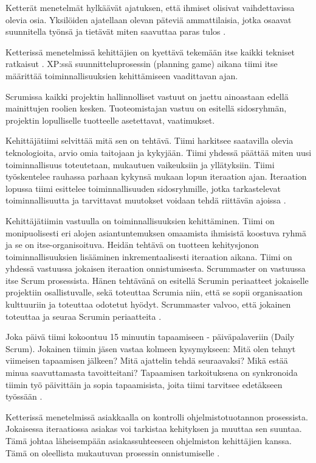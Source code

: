 \documentclass[finnish]{tktltiki2}
\theoremstyle{definition}
\theoremstyle{remark}
\begin{document}
Ketterät menetelmät hylkäävät ajatuksen, että ihmiset olisivat vaihdettavissa olevia osia. Yksilöiden ajatellaan olevan päteviä ammattilaisia, jotka osaavat suunnitella työnsä ja tietävät miten saavuttaa paras tulos \cite{FOW01a}.

Ketterissä menetelmissä kehittäjien on kyettävä tekemään itse kaikki tekniset ratkaisut \cite{FOW01a}.  XP:ssä suunnitteluprosessin (planning game) aikana tiimi itse määrittää toiminnallisuuksien kehittämiseen vaadittavan ajan.
 
Scrumissa kaikki projektin hallinnolliset vastuut on jaettu ainoastaan edellä mainittujen roolien kesken. Tuoteomistajan vastuu on esitellä sidosryhmän, projektin lopulliselle tuotteelle asetettavat, vaatimukset.

Kehittäjätiimi selvittää mitä sen on tehtävä. Tiimi harkitsee saatavilla olevia teknologioita, arvio omia taitojaan ja kykyjään. Tiimi yhdessä päättää miten uusi toiminnallisuus toteutetaan, mukautuen vaikeuksiin ja yllätyksiin. Tiimi työskentelee rauhassa parhaan kykynsä mukaan lopun iteraation ajan. Iteraation lopussa tiimi esittelee toiminnallisuuden sidosryhmille, jotka tarkastelevat toiminnallisuutta ja tarvittavat muutokset voidaan tehdä riittävän ajoissa \cite{SCH09}.

Kehittäjätiimin vastuulla on toiminnallisuuksien kehittäminen. Tiimi on monipuolisesti eri alojen asiantuntemuksen omaamista ihmisistä koostuva ryhmä ja se on itse-organisoituva. Heidän tehtävä on tuotteen kehitysjonon toiminnallisuuksien lisääminen inkrementaalisesti iteraation aikana. Tiimi on yhdessä vastuussa jokaisen iteraation onnistumisesta. Scrummaster on vastuussa itse Scrum prosessista. Hänen tehtävänä on esitellä Scrumin periaatteet jokaiselle projektiin osallistuvalle, sekä toteuttaa Scrumia niin, että se sopii organisaation kulttuuriin ja toteuttaa odotetut hyödyt. Scrummaster valvoo, että jokainen toteuttaa ja seuraa Scrumin periaatteita \cite{SCH09}.

Joka päivä tiimi kokoontuu 15 minuutin tapaamiseen - päiväpalaveriin (Daily Scrum). Jokainen tiimin jäsen vastaa kolmeen kysymykseen: Mitä olen tehnyt viimeisen tapaamisen jälkeen? Mitä ajattelin tehdä seuraavaksi? Mikä estää minua saavuttamasta tavoitteitani? Tapaamisen tarkoituksena on synkronoida tiimin työ päivittäin ja sopia tapaamisista, joita tiimi tarvitsee edetäkseen työssään \cite{SCH09}.

Ketterissä menetelmissä asiakkaalla on kontrolli ohjelmistotuotannon prosessista. Jokaisessa iteraatiossa asiakas voi tarkistaa kehityksen ja muuttaa sen suuntaa. Tämä johtaa läheisempään asiakassuhteeseen ohjelmiston kehittäjien kanssa. Tämä on oleellista mukautuvan prosessin onnistumiselle \cite{FOW01a}.
\end{document}
